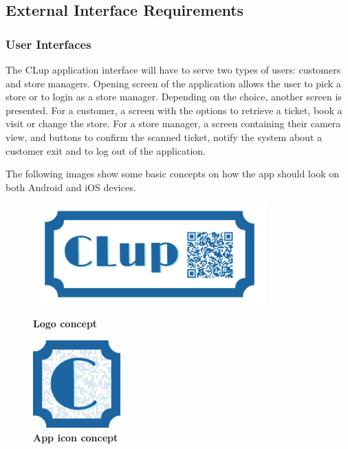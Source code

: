 \subsection{External Interface Requirements}
\subsubsection{User Interfaces}
\hspace{\parindent}The CLup application interface will have to serve two types of users: customers and store managers. Opening screen of the application allows the user to pick a store or to login as a store manager. Depending on the choice, another screen is presented. For a customer, a screen with the options to retrieve a ticket, book a visit or change the store. For a store manager, a screen containing their camera view, and buttons to confirm the scanned ticket, notify the system about a customer exit and to log out of the application. 

The following images show some basic concepts on how the app should look on both Android and iOS devices.
\captionsetup{justification=centering}

\begin{figure}[!htb]
\centering
\begin{minipage}{0.4\textwidth}
\centering
\includegraphics[width=0.8\textwidth]{Images/App/Logov2_Blue2_Bck}
\caption{\label{fig:android1}\textbf{Logo concept}}
\end{minipage}
\begin{minipage}{0.4\textwidth}
\centering
\includegraphics[width=0.3\textwidth]{Images/App/AppIcon}
\captionsetup{justification=centering}
\caption{\label{fig:ios1}\textbf{App icon concept}}
\end{minipage}
\end{figure}

